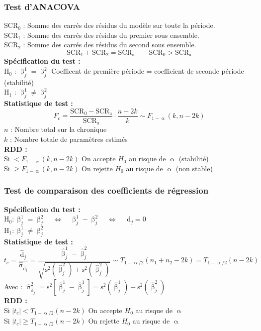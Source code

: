 \documentclass{article}
\begin{document}
\subsubsection{Test d'ANACOVA}
SCR$_0$ : Somme des carrés des résidus du modèle sur toute la période.\\
SCR$_1$ : Somme des carrés des résidus du premier sous ensemble.\\
SCR$_2$ : Somme des carrés des résidus du second sous ensemble.\\
\begin{equation*}
	\text{SCR}_1 + \text{SCR}_2 = \text{SCR}_{\text{a}} \qquad \text{SCR}_0 > \text{SCR}_{\text{a}}
\end{equation*}
\textbf{Spécification du test :} \\
H$_0$ : $\upbeta_j^1 = \upbeta_j^2$ \quad Coefficent de première période = coefficient de seconde période (stabilité) \\
H$_1$ : $\upbeta_j^1 \neq \upbeta_j^2$  \\
\textbf{Statistique de test :}
\begin{equation*}
		F_c = \frac{\text{SCR}_0 - \text{SCR}_{\text{a}}}{\text{SCR}_{\text{a}}} \cdot \frac{n - 2k}{k} \sim F_{1-\upalpha}(k,n-2k)
\end{equation*}
$n$ : Nombre total sur la chronique \\
$k$ : Nombre totale de paramètres estimés \\
\textbf{RDD : } \\
Si $ < F_{1-\upalpha}(k,n-2k)$ On accepte $H_0$ au risque de $\upalpha$ (stabilité)\\
Si $ \geq F_{1-\upalpha}(k,n-2k)$ On rejette $H_0$ au risque de $\upalpha$ (non stable)
\subsubsection{Test de comparaison des coefficients de régression}
\textbf{Spécification du test :} \\
H$_0 : \upbeta_j^1 = \upbeta_j^2 \quad \Leftrightarrow \quad \upbeta_j^1 - \upbeta_j^2 \quad \Leftrightarrow \quad $ \textbf{$\text{d}_j = 0 $} \\
H$_1 : \upbeta_j^1 \neq \upbeta_j^2$ \\
\textbf{Statistique de test :}
\begin{equation*}
		t_c = \frac{\hat{\text{d}}_j}{\hat{\upsigma}_{\hat{\text{d}_j}}} = \frac{\hat{\upbeta}_j^1 - \hat{\upbeta}_j^2}{\sqrt{\text{s}^2\left( \hat{\upbeta}_j^2 \right) + \text{s}^2\left( \hat{\upbeta}_j^2 \right) } } \sim T_{1-\upalpha/2}(n_1 + n_2 -2k) = T_{1-\upalpha/2}(n-2k)
\end{equation*}
Avec : $\hat{\upsigma}_{\hat{\text{d}}_j}^2 = \text{s}^2 \left[ \hat{\upbeta}_j^1 - \hat{\upbeta}_j^1 \right] = \text{s}^2(\hat{\upbeta}_j^1) + \text{s}^2(\hat{\upbeta}_j^2)$\\
\textbf{RDD : } \\
Si $ \left| t_c \right| < T_{1-\upalpha/2}(n-2k)$ On accepte $H_0$ au risque de $\upalpha$\\
Si $ \left| t_c \right| \geq T_{1-\upalpha/2}(n-2k)$ On rejette $H_0$ au risque de $\upalpha$ 
\end{document}

